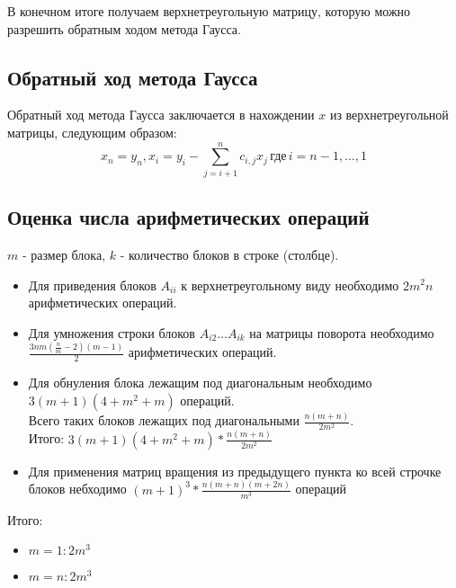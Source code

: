 \documentclass[a4paper, fontsize=14pt]{article}
\begin{document}
		В конечном итоге получаем верхнетреугольную матрицу, которую можно разрешить обратным ходом метода Гаусса.
	 	\subsection{Обратный ход метода Гаусса}
	    Обратный ход метода Гаусса заключается в нахождении $x$ из верхнетреугольной матрицы, следующим образом:
	 	$$x_n = y_n, x_i = y_i - \sum_{j = i+1}^{n} c_{i,j}x_j \,\text{где} \, i=n-1,\dots,1$$
	 	
		\subsection{Оценка числа арифметических операций}
		$m$ - размер блока, $k$ - количество блоков в строке (столбце). 
		\begin{itemize}
			\item Для приведения блоков $A_{ii}$ к верхнетреугольному виду необходимо $2m^2n$ арифметических операций.
			\item Для умножения строки блоков $A_{i2}\dots A_{ik}$ на матрицы поворота необходимо $\frac{3nm(\frac{n}{m}-2)(m-1)}{2}$ арифметических операций.
			\item Для обнуления блока лежащим под диагональным необходимо $3(m+1)(4 + m^2 +m)$ операций.
			\\Всего таких блоков лежащих под диагональными $\frac{n(m+n)}{2m^2}$.
			\\ Итого: $3(m+1)(4 + m^2 +m) * \frac{n(m+n)}{2m^2}$
			\item Для применения матриц вращения из предыдущего пункта ко всей строчке блоков небходимо $(m+1)^3 *\frac{n(m+n)(m+2n)}{m^3}$ операций
			
		\end{itemize}
		Итого:
	
		\begin{itemize}
			\item $m = 1: 2m^3$
			\item $m = n: 2m^3$
		\end{itemize}
\end{document}
